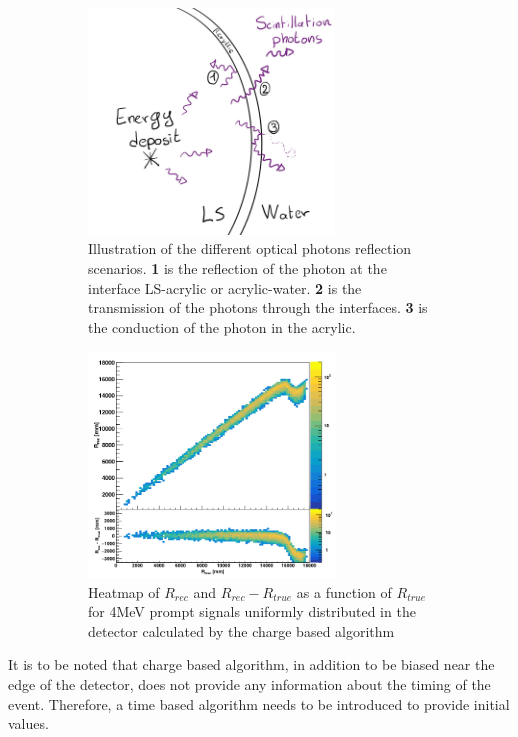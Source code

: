 \documentclass[../main.tex]{subfiles}
\begin{document}
\begin{figure}[ht]
  \begin{subfigure}[t]{0.48\textwidth}
    \centering
    \includegraphics[height=6cm]{images/juno/reco/Reflexion_scenarii.jpg}
    \caption{Illustration of the different optical photons reflection scenarios. \textbf{1} is the reflection of the photon at the interface LS-acrylic or acrylic-water. \textbf{2} is the transmission of the photons through the interfaces. \textbf{3} is the conduction of the photon in the acrylic.}
    \label{fig:juno:rec:refl}
  \end{subfigure}
  \hfill
  \begin{subfigure}[t]{0.48\textwidth}
    \centering
    \includegraphics[height=6cm]{images/juno/reco/charge_barycenter.png}
    \caption{Heatmap of $R_{rec}$ and $R_{rec} - R_{true}$ as a function of $R_{true}$ for 4MeV prompt signals uniformly distributed in the detector calculated by the charge based algorithm}
    \label{fig:juno:rec:cbary}
  \end{subfigure}
  \caption{}
\end{figure}

It is to be noted that charge based algorithm, in addition to be biased near the edge of the detector, does not provide any information about the timing of the event. Therefore, a time based algorithm needs to be introduced to provide initial values.
\end{document}
